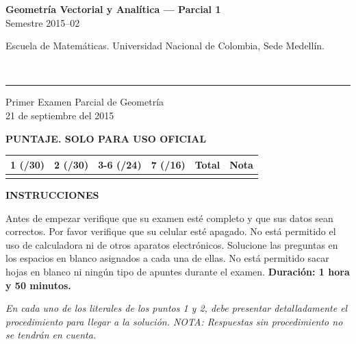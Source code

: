 \documentclass[11pt]{article}
\newcommand{\examheader}{%
  \noindent
  \begin{minipage}[t]{0.6\linewidth}
    {\small\bfseries Geometría Vectorial y Analítica --- Parcial 1}\\
    {\small Semestre 2015--02}
  \end{minipage}%
  \hfill
  \begin{minipage}[t]{0.35\linewidth}
    \raggedleft\small Escuela de Matemáticas. Universidad Nacional de Colombia, Sede Medellín.
  \end{minipage}\\[2pt]
  \rule{\linewidth}{0.6pt}
}
\newcommand{\nota}[1]{{\small\itshape\color{unalblue!70!black} #1}}
\begin{document}
\examheader

\begin{center}
{\Large Primer Examen Parcial de Geometría}\\[4pt]
{\small 21 de septiembre del 2015}
\end{center}

\vspace{10pt}
\textbf{PUNTAJE. SOLO PARA USO OFICIAL}

\begin{center}
\begin{tabular}{|c|c|c|c|c|c|}
\hline
1 (/30) & 2 (/30) & 3-6 (/24) & 7 (/16) & Total & Nota \\
\hline
 & & & & & \\
\hline
\end{tabular}
\end{center}

\vspace{10pt}
\textbf{INSTRUCCIONES}

Antes de empezar verifique que su examen esté completo y que sus datos sean correctos. Por favor verifique que su celular esté apagado. No está permitido el uso de calculadora ni de otros aparatos electrónicos. Solucione las preguntas en los espacios en blanco asignados a cada una de ellas. No está permitido sacar hojas en blanco ni ningún tipo de apuntes durante el examen. \textbf{Duración: 1 hora y 50 minutos.}

\vspace{6pt}
\nota{En cada uno de los literales de los puntos 1 y 2, debe presentar detalladamente el procedimiento para llegar a la solución. NOTA: Respuestas sin procedimiento no se tendrán en cuenta.}
\end{document}
